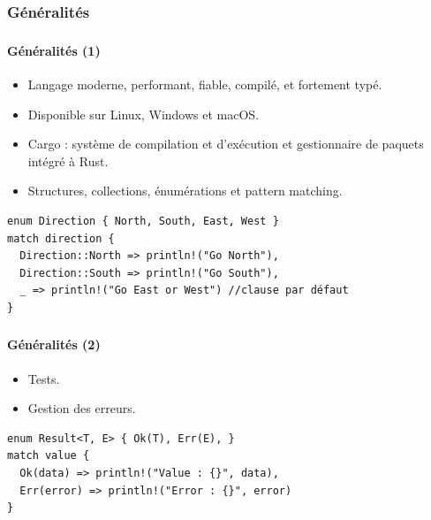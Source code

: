 \documentclass[10pt]{beamer}
\begin{document}
\subsubsection{Généralités}
\begin{frame}[fragile]
    \frametitle{\subsecname}
    \framesubtitle{Généralités (1)}
    \begin{itemize}
        \item Langage moderne, performant, fiable, compilé, et fortement typé.
        \item Disponible sur Linux, Windows et macOS.
        \item Cargo : système de compilation et d'exécution et gestionnaire de paquets intégré à Rust.
        \item Structures, collections, énumérations et pattern matching. 
    \end{itemize}

    \begin{verbatim}
enum Direction { North, South, East, West }
match direction {
  Direction::North => println!("Go North"),
  Direction::South => println!("Go South"),
  _ => println!("Go East or West") //clause par défaut
}
    \end{verbatim}
\end{frame}

\begin{frame}[fragile]
    \frametitle{\subsecname}
    \framesubtitle{Généralités (2)}
    \begin{itemize}
        \item Tests.
        \item Gestion des erreurs.
    \end{itemize}
    \begin{verbatim}
enum Result<T, E> { Ok(T), Err(E), }
match value {
  Ok(data) => println!("Value : {}", data),
  Err(error) => println!("Error : {}", error)
}
    \end{verbatim}
\end{frame}
\end{document}
